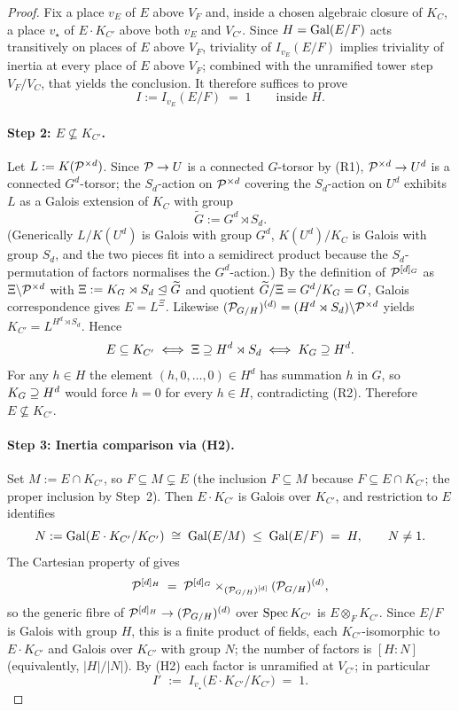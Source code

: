 \documentclass[11pt]{article}
\begin{document}
\begin{proof}
Fix a place $v_E$ of $E$ above $V_F$ and, inside a chosen algebraic closure
of $K_C$, a place $v_\star$ of $E \cdot K_{C'}$ above both $v_E$ and
$V_{C'}$.  Since $H = \operatorname{Gal}(E/F)$ acts transitively on places of $E$ above
$V_F$, triviality of $I_{v_E}(E/F)$ implies triviality of inertia at every
place of $E$ above $V_F$; combined with the unramified tower step
$V_F/V_C$, that yields the conclusion.  It therefore suffices to prove
\[
I := I_{v_E}(E/F) \;=\; 1 \qquad \text{inside } H .
\]

\paragraph{Step 2: $E \not\subseteq K_{C'}$.}
Let $L := K(\mathcal{P}^{\times d})$.  Since $\mathcal{P} \to U$ is a connected $G$-torsor by
(R1), $\mathcal{P}^{\times d} \to U^d$ is a connected $G^d$-torsor; the $S_d$-action
on $\mathcal{P}^{\times d}$ covering the $S_d$-action on $U^d$ exhibits $L$ as a
Galois extension of $K_C$ with group
\[
\widetilde G := G^d \rtimes S_d .
\]
(Generically $L/K(U^d)$ is Galois with group $G^d$, $K(U^d)/K_C$ is Galois
with group $S_d$, and the two pieces fit into a semidirect product because
the $S_d$-permutation of factors normalises the $G^d$-action.)
By the definition of $\mathcal{P}^{[d]_G}$ as $\Xi \backslash \mathcal{P}^{\times d}$ with
$\Xi := K_{G} \rtimes S_d \trianglelefteq \widetilde G$ and quotient
$\widetilde G/\Xi = G^d/K_{G} = G$, Galois correspondence gives
$E = L^\Xi$.  Likewise
$(\mathcal{P}_{G/H})^{(d)} = (H^d \rtimes S_d)\backslash \mathcal{P}^{\times d}$ yields
$K_{C'} = L^{H^d \rtimes S_d}$.  Hence
\[
E \subseteq K_{C'}
   \iff \Xi \supseteq H^d \rtimes S_d
   \iff K_{G} \supseteq H^d .
\]
For any $h \in H$ the element $(h, 0, \dots, 0) \in H^d$ has summation $h$
in $G$, so $K_{G} \supseteq H^d$ would force $h = 0$ for every $h \in H$,
contradicting (R2).  Therefore $E \not\subseteq K_{C'}$.

\paragraph{Step 3: Inertia comparison via (H2).}
Set $M := E \cap K_{C'}$, so $F \subseteq M \subsetneq E$ (the inclusion
$F \subseteq M$ because $F \subseteq E \cap K_{C'}$; the proper inclusion
by Step~2).  Then $E \cdot K_{C'}$ is Galois over $K_{C'}$, and restriction
to $E$ identifies
\[
N := \operatorname{Gal}(E \cdot K_{C'} / K_{C'}) \;\cong\; \operatorname{Gal}(E/M)
    \;\leq\; \operatorname{Gal}(E/F) \;=\; H ,
\qquad N \neq 1 .
\]
The Cartesian property of  gives
\[
\mathcal{P}^{[d]_H} \;=\; \mathcal{P}^{[d]_G} \times_{(\mathcal{P}_{G/H})^{[d]}} (\mathcal{P}_{G/H})^{(d)} ,
\]
so the generic fibre of $\mathcal{P}^{[d]_H} \to (\mathcal{P}_{G/H})^{(d)}$ over $\operatorname{Spec} K_{C'}$
is $E \otimes_F K_{C'}$.  Since $E/F$ is Galois with group $H$, this is a
finite product of fields, each $K_{C'}$-isomorphic to $E \cdot K_{C'}$ and
Galois over $K_{C'}$ with group $N$; the number of factors is $[H : N]$
(equivalently, $|H|/|N|$).  By (H2) each factor is unramified at $V_{C'}$;
in particular
\[
I' \;:=\; I_{v_\star}\!\bigl(E \cdot K_{C'} / K_{C'}\bigr) \;=\; 1 .
\]


\end{proof}
\end{document}
